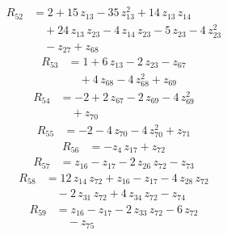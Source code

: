 \begin{equation*}\begin{aligned}
R_{52}&=2 +15\,z_{13} -35\,z_{13}^{2} +14\,z_{13}\,z_{14} \\
&\quad +24\,z_{13}\,z_{23} -4\,z_{14}\,z_{23} -5\,z_{23} -4\,z_{23}^{2} \\
&\quad -z_{27} +z_{68}
\end{aligned}\end{equation*}
\begin{equation*}\begin{aligned}
R_{53}&=1 +6\,z_{13} -2\,z_{23} -z_{67} \\
&\quad +4\,z_{68} -4\,z_{68}^{2} +z_{69}
\end{aligned}\end{equation*}
\begin{equation*}\begin{aligned}
R_{54}&=-2 +2\,z_{67} -2\,z_{69} -4\,z_{69}^{2} \\
&\quad +z_{70}
\end{aligned}\end{equation*}
\begin{equation*}\begin{aligned}
R_{55}&=-2 -4\,z_{70} -4\,z_{70}^{2} +z_{71}
\end{aligned}\end{equation*}
\begin{equation*}\begin{aligned}
R_{56}&=-z_{4}\,z_{17} +z_{72}
\end{aligned}\end{equation*}
\begin{equation*}\begin{aligned}
R_{57}&=z_{16} -z_{17} -2\,z_{26}\,z_{72} -z_{73}
\end{aligned}\end{equation*}
\begin{equation*}\begin{aligned}
R_{58}&=12\,z_{14}\,z_{72} +z_{16} -z_{17} -4\,z_{28}\,z_{72} \\
&\quad -2\,z_{31}\,z_{72} +4\,z_{34}\,z_{72} -z_{74}
\end{aligned}\end{equation*}
\begin{equation*}\begin{aligned}
R_{59}&=z_{16} -z_{17} -2\,z_{33}\,z_{72} -6\,z_{72} \\
&\quad -z_{75}
\end{aligned}\end{equation*}
